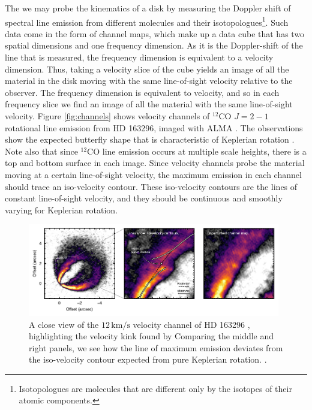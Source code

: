 The we may probe the kinematics of a disk by measuring the Doppler shift of spectral line emission from different molecules and their isotopologues\footnote{Isotopologues are molecules that are different only by the isotopes of their atomic components.}.
Such data come in the form of channel maps, which make up a data cube that has two spatial dimensions and one frequency dimension.
As it is the Doppler-shift of the line that is measured, the frequency dimension is equivalent to a velocity dimension.
Thus, taking a velocity slice of the cube yields an image of all the material in the disk moving with the same line-of-sight velocity relative to the observer.
The frequency dimension is equivalent to velocity, and so in each frequency slice we find an image of all the material with the same line-of-sight velocity.
Figure \ref{fig:channels} shows velocity channels of $^{12}$CO $J=2-1$ rotational line emission from HD 163296, imaged with ALMA \citep{andrews2018}.
The observations show the expected butterfly shape that is characteristic of Keplerian rotation \citep{degregorio-monsalvo2013}.
Note also that since $^{12}$CO line emission occurs at multiple scale heights, there is a top and bottom surface in each image.
Since velocity channels probe the material moving at a certain line-of-sight velocity, the maximum emission in each channel should trace an iso-velocity contour.
These iso-velocity contours are the lines of constant line-of-sight velocity, and they should be continuous and smoothly varying for Keplerian rotation.

\begin{figure}
    \centering
    \includegraphics[width = 0.98\textwidth]{figures/HD163296_channels.pdf}
    \caption{A close view of the $12 \,\mathrm{km/s}$ velocity channel of HD 163296 \citep{andrews2018}, highlighting the velocity kink found by \citet{pinte2018a} Comparing the middle and right panels, we see how the line of maximum emission deviates from the iso-velocity contour expected from pure Keplerian rotation. \citep{diskdynamicscollaboration2020}.}
    \label{fig:velocity_kink}
\end{figure}

